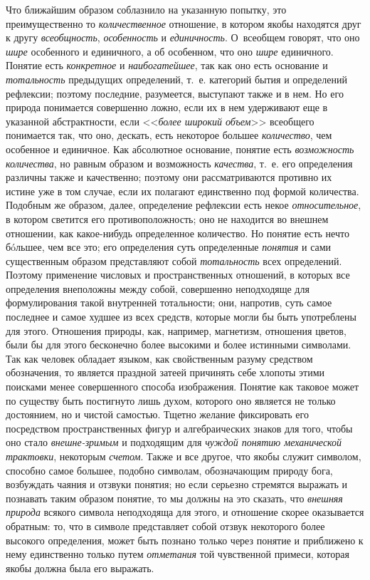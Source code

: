 Что ближайшим образом соблазнило на указанную попытку, это
преимущественно то {\em количественное}
отношение, в котором якобы находятся друг к другу
{\em всеобщность}, {\em особенность} и {\em единичность}.
О~всеобщем говорят, что оно {\em шире}
особенного и единичного, а об особенном, что оно
{\em шире} единичного.  Понятие есть {\em конкретное}
и {\em наибогатейшее}, так как оно есть основание и {\em тотальность}
предыдущих определений, т.~е. категорий бытия и определений
рефлексии; поэтому последние, разумеется, выступают также и в нем. Но его
природа понимается совершенно ложно, если их в нем удерживают еще в
указанной абстрактности, если <<{\em более широкий объем}>>
всеобщего понимается так, что оно, дескать, есть некоторое
большее {\em количество},
чем особенное и единичное. Как абсолютное основание, понятие
есть {\em возможность количества},
но равным образом и возможность {\em качества}, т.~е. его
определения различны также и качественно; поэтому они рассматриваются
противно их истине уже в том случае, если их полагают единственно под
формой количества. Подобным же образом, далее, определение рефлексии есть
некое {\em относительное},
в котором светится его противоположность; оно не находится во
внешнем отношении, как какое-нибудь определенное количество. Но понятие
есть нечто бóльшее, чем все это; его определения суть определенные
{\em понятия} и сами существенным образом представляют собой
{\em тотальность} всех
определений. Поэтому применение числовых и пространственных отношений, в
которых все определения внеположны между собой, совершенно неподходяще для
формулирования такой внутренней тотальности; они, напротив, суть самое
последнее и самое худшее из всех средств, которые могли бы быть употреблены
для этого. Отношения природы, как, например, магнетизм, отношения цветов,
были бы для этого бесконечно более высокими и более истинными символами.
Так как человек обладает языком, как свойственным разуму средством
обозначения, то является праздной затеей причинять себе
хлопоты этими поисками менее совершенного способа изображения. Понятие как
таковое может по существу быть постигнуто лишь духом, которого оно является
не только достоянием, но и чистой самостью. Тщетно желание фиксировать его
посредством пространственных фигур и алгебраических знаков для того, чтобы
оно стало {\em внешне-зримым
}и подходящим для
{\em чуждой понятию механической
трактовки}, некоторым
{\em счетом}. Также и все
другое, что якобы служит символом, способно самое большее, подобно
символам, обозначающим природу бога, возбуждать чаяния и отзвуки понятия;
но если серьезно стремятся выражать и познавать таким образом понятие, то
мы должны на это сказать, что
{\em внешняя природа}
всякого символа неподходяща для этого, и отношение скорее
оказывается обратным: то, что в символе представляет собой отзвук
некоторого более высокого определения, может быть познано только через
понятие и приближено к нему единственно только путем
{\em отметания} той
чувственной примеси, которая якобы должна была его выражать.

